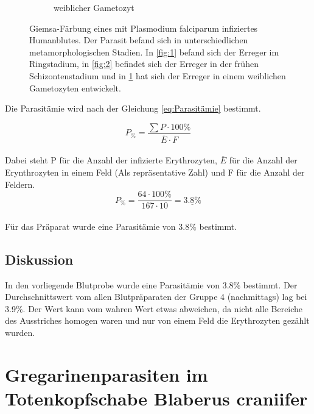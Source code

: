 \documentclass[oneside,10pt,a4paper]{report}
\begin{document}
\begin{figure}[H]
\begin{subfigure}[b]{0.3\textwidth}
						\caption{weiblicher Gametozyt}
						\label{fig:3}
					\end{subfigure}
					\caption{Giemsa-Färbung eines mit Plasmodium falciparum infiziertes Humanblutes. Der Parasit befand sich in unterschiedlichen metamorphologischen Stadien. In \ref{fig:1} befand sich der Erreger im Ringstadium, in \ref{fig:2} befindet sich der Erreger in der frühen Schizontenstadium und in \ref{fig:3} hat sich der Erreger in einem weiblichen Gametozyten entwickelt.}
					\label{fig: p_falciparum}
				\end{figure}
				
				Die Parasitämie wird nach der Gleichung \ref*{eq:Parasitämie} bestimmt.
				
				\begin{equation}\label{eq:Parasitämie}
					P_{\%} = \frac{\sum P \cdot 100 \%}{\overline{E} \cdot F}
				\end{equation}
				\\
				Dabei steht P für die Anzahl der infizierte Erythrozyten, $\overline{E}$ für die Anzahl der Erynthrozyten in einem Feld (Als repräsentative Zahl) und F für die Anzahl der Feldern.\\
				
				\begin{equation}\nonumber
					P_{\%} = \frac{64 \cdot 100 \%}{167 \cdot 10} = \underline{3.8 \%}
				\end{equation}
				\\
				Für das Präparat wurde eine Parasitämie von 3.8$\%$ bestimmt.
			\subsection{Diskussion}
				In den vorliegende Blutprobe wurde eine Parasitämie von 3.8$\%$ bestimmt.
				Der Durchschnittswert vom allen Blutpräparaten der Gruppe 4 (nachmittags) lag bei 3.9$\%$. 
				Der Wert kann vom wahren Wert etwas abweichen, da nicht alle Bereiche des Ausstriches homogen waren und nur von einem Feld die Erythrozyten gezählt wurden.\\
	
		\section{Gregarinenparasiten im Totenkopfschabe Blaberus craniifer}
\end{document}
